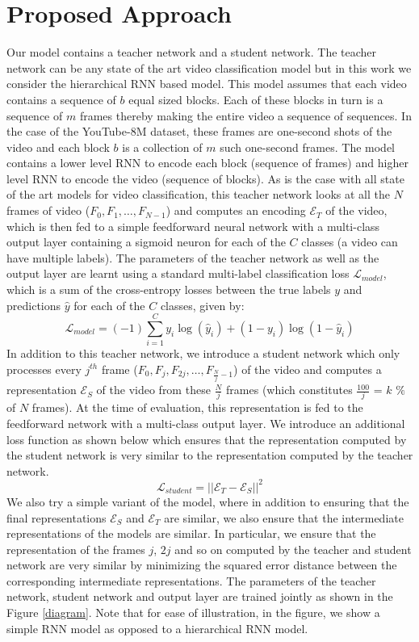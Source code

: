 \documentclass[10pt,twocolumn,letterpaper]{article}
\begin{document}
\section{Proposed Approach}\label{section3}
Our model contains a teacher network and a student network. The teacher network can be any state of the art video classification model but in this work we consider the hierarchical RNN based model. This model assumes that each video contains a sequence of $b$ equal sized blocks. Each of these blocks in turn is a sequence of $m$ frames thereby making the entire video a sequence of sequences. In the case of the YouTube-8M dataset, these frames are one-second shots of the video and each block $b$ is a collection of $m$ such one-second frames. The model contains a lower level RNN to encode each block (sequence of frames) and higher level RNN to encode the video (sequence of blocks). As is the case with all state of the art models for video classification, this teacher network looks at all the $N$ frames of video ($F_{0}, F_{1},\dots,F_{N-1}$) and computes an encoding $\mathcal{E}_{T}$ of the video, which is then fed to a simple feedforward neural network with a multi-class output layer containing a sigmoid neuron for each of the $C$ classes (a video can have multiple labels). The parameters of the teacher network as well as the output layer are learnt using  a standard multi-label classification loss $\mathcal{L}_{model}$, which is a sum of the cross-entropy losses between the true labels $y$ and predictions $\hat{y}$ for each of the $C$ classes, given by:\[ \mathcal{L}_{model} = (- 1) \sum_{i=1}^{C} y_{i} \log(\hat{y}_{i}) + (1- y_{i}) \log(1- \hat{y}_{i}) \]
In addition to this teacher network, we introduce a student network which only processes every $j^{th}$  frame ($F_0, F_j, F_{2j}, \dots, F_{\frac{N}{j}-1} $) of the video and computes a representation $\mathcal{E}_S$ of the video from these $\frac{N}{j}$ frames (which constitutes $\frac{100}{j}$ = $k$ $\%$ of $N$ frames). At the time of evaluation, this representation is fed to the feedforward network with a multi-class output layer. We introduce an additional loss function as shown below which ensures that the representation computed by the student network is very similar to the representation computed by the teacher network.  
\begin{equation*}
 \mathcal{L}_{student} = || \mathcal{E}_{T} - \mathcal{E}_{S} ||^{2}
\end{equation*}
We also try a simple variant of the model, where in addition to ensuring that the final representations $\mathcal{E}_S$ and $\mathcal{E}_T$  are similar, we also ensure that the intermediate representations of the models are similar. In particular, we ensure that the representation of the frames $j$, $2j$ and so on computed by the teacher and  student network are very similar by minimizing the squared error distance between the corresponding intermediate representations. The parameters of the teacher network, student network and output layer are trained jointly as shown in the Figure \ref{diagram}. Note that for ease of illustration, in the figure, we show a simple RNN model as opposed to a hierarchical RNN model. 
\end{document}
